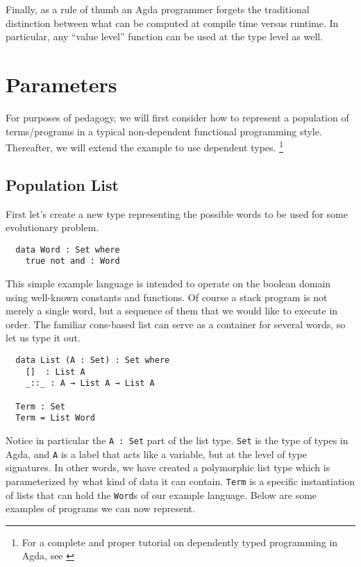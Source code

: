 \documentclass[runningheads,a4paper]{llncs}
\begin{document}
Finally, as a rule of thumb an Agda programmer forgets the traditional
distinction between what can be computed at compile time versus runtime. In
particular, any ``value level'' function can be used at the type level
as well.

\section{Parameters}

For purposes of pedagogy, we will first consider how to represent a
population of terms/programs in a typical non-dependent functional
programming style. Thereafter, we will extend the example to use
dependent types.
\footnote{For a complete and proper tutorial on dependently typed programming in Agda, see \cite{norell:agdatut}}

\subsection{Population List}

First let's create a new type representing the possible words to be
used for some evolutionary problem.

\begin{verbatim}
  data Word : Set where
    true not and : Word
\end{verbatim}

This simple example language is intended to operate on the boolean domain using
well-known constants and functions. Of course a stack program is not
merely a single word, but a sequence of them that we would like to
execute in order. The familiar cons-based list can serve as a
container for several words, so let us type it out.

\begin{verbatim}
  data List (A : Set) : Set where
    []  : List A
    _::_ : A → List A → List A

  Term : Set
  Term = List Word
\end{verbatim}

Notice in particular the \texttt{A : Set} part of the list
type. \texttt{Set} is the type of types in Agda, and \texttt{A} is
a label that acts like a variable, but at the level of type
signatures. In other words, we have created a polymorphic list type
which is parameterized by what kind of data it can
contain. \texttt{Term} is a specific instantiation of lists that can
hold the \texttt{Word}s of our example language. Below are some
examples of programs we can now represent.
\end{document}

